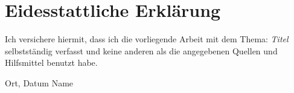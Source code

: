 \section*{Eidesstattliche Erklärung}

	Ich versichere hiermit, dass ich die vorliegende Arbeit mit dem Thema: \textit{Titel} selbstständig verfasst und keine anderen als die angegebenen Quellen und Hilfsmittel benutzt habe.

	\vspace{3cm}
	Ort, Datum \hspace{11cm} Name